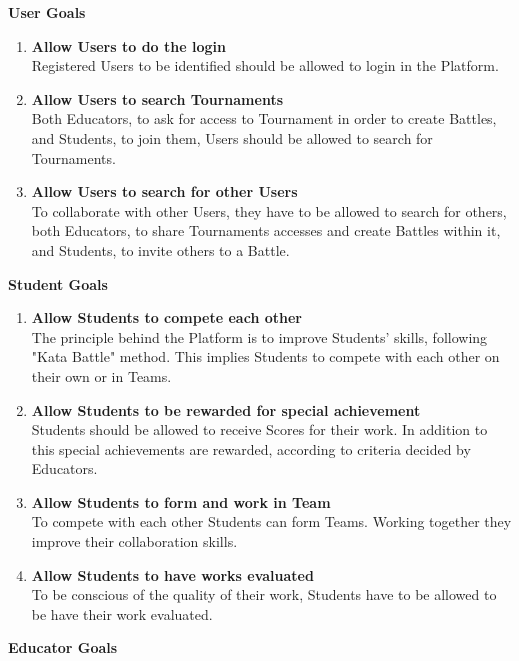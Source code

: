 \textbf{User Goals}
    \begin{enumerate}[label=$\bullet$ \textbf{GU\arabic*:}]
        \item \textbf{Allow Users to do the login}\\Registered Users to be identified should be allowed to login in the Platform.
        \item \textbf{Allow Users to search Tournaments}\\Both Educators, to ask for access to Tournament in order to create Battles, and Students, to join them, Users should be allowed to search for Tournaments.
        \item \textbf{Allow Users to search for other Users}\\To collaborate with other Users, they have to be allowed to search for others, both Educators, to share Tournaments accesses and create Battles within it, and Students, to invite others to a Battle.
    \end{enumerate}
\textbf{Student Goals}
\begin{enumerate}[label=$\bullet$ \textbf{GS\arabic*:}]
    \item \textbf{Allow Students to compete each other}\\The principle behind the Platform is to improve Students' skills, following "Kata Battle" method. This implies Students to compete with each other on their own or in Teams.
    \item \textbf{Allow Students to be rewarded for special achievement}\\Students should be allowed to receive Scores for their work. In addition to this special achievements are rewarded, according to criteria decided by Educators.
    \item \textbf{Allow Students to form and work in Team}\\To compete with each other Students can form Teams. Working together they improve their collaboration skills.
    \item \textbf{Allow Students to have works evaluated}\\To be conscious of the quality of their work, Students have to be allowed to be have their work evaluated.
\end{enumerate}
\textbf{Educator Goals}

